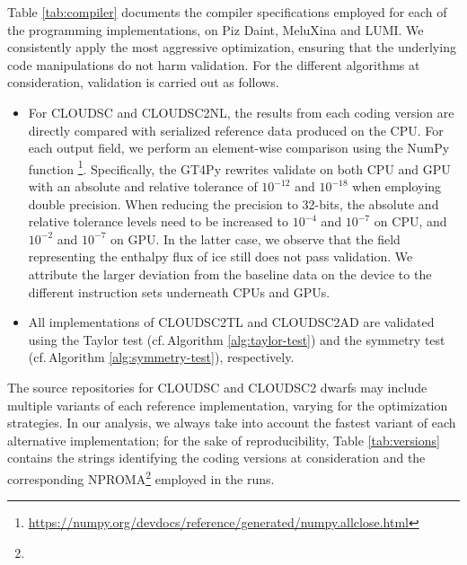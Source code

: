 \documentclass[main.tex]{subfiles}
\begin{document}
        \noindent Table \ref{tab:compiler} documents the compiler specifications employed for each of the programming implementations, on Piz Daint, MeluXina and LUMI. We consistently apply the most aggressive optimization, ensuring that the underlying code manipulations do not harm validation. For the different algorithms at consideration, validation is carried out as follows.
        \begin{itemize}
            \item For CLOUDSC and CLOUDSC2NL, the results from each coding version are directly compared with serialized reference data produced on the CPU. For each output field, we perform an element-wise comparison using the NumPy function \footnote{\url{https://numpy.org/devdocs/reference/generated/numpy.allclose.html}}. Specifically, the GT4Py rewrites validate on both CPU and GPU with an absolute and relative tolerance of $10^{-12}$ and $10^{-18}$ when employing double precision. When reducing the precision to 32-bits, the absolute and relative tolerance levels need to be increased to $10^{-4}$ and $10^{-7}$ on CPU, and $10^{-2}$ and $10^{-7}$ on GPU. In the latter case, we observe that the field representing the enthalpy flux of ice still does not pass validation. We attribute the larger deviation from the baseline data on the device to the different instruction sets underneath CPUs and GPUs.
            \item All implementations of CLOUDSC2TL and CLOUDSC2AD are validated using the Taylor test (cf.\,Algorithm \ref{alg:taylor-test}) and the symmetry test (cf.\,Algorithm \ref{alg:symmetry-test}), respectively. 
        \end{itemize}
        \noindent The source repositories for CLOUDSC and CLOUDSC2 dwarfs may include multiple variants of each reference implementation, varying for the optimization strategies. In our analysis, we always take into account the fastest variant of each alternative implementation; for the sake of reproducibility, Table \ref{tab:versions} contains the strings identifying the coding versions at consideration and the corresponding NPROMA\footnote{} employed in the runs. 
\end{document}
